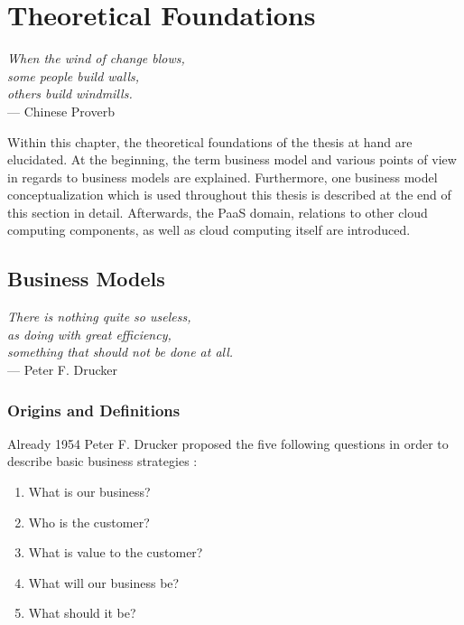 \chapter{Theoretical Foundations}\label{ch:tf}

\begin{flushright}{\slshape    
	When the wind of change blows,\\
	some people build walls,\\
	others build windmills.} \\ \medskip
	--- Chinese Proverb
\end{flushright}

Within this chapter, the theoretical foundations of the thesis at hand are elucidated. At the beginning, the term business model and various points of view in regards to business models are explained. Furthermore, one business model conceptualization which is used throughout this thesis is described at the end of this section in detail. Afterwards, the \ac{PaaS} domain, relations to other cloud computing components, as well as cloud computing itself are introduced.

\section{Business Models}\label{ch:tf:bm}

\begin{flushright}{\slshape    
	There is nothing quite so useless,\\
	as doing with great efficiency, \\
	something that should not be done at all.} \\ \medskip
	--- Peter F. Drucker
\end{flushright}

\subsection{Origins and Definitions}

Already 1954 Peter F. Drucker proposed the five following questions in order to describe basic business strategies \citep[pp. 49-61]{Drucker1954}:

\begin{enumerate}
	\item What is our business?
	\item Who is the customer?
	\item What is value to the customer?
	\item What will our business be?
	\item What should it be?
\end{enumerate}

